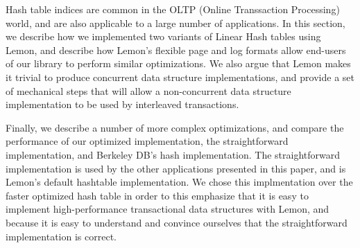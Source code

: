 \documentclass[letterpaper,twocolumn,english]{article}
\newcommand{\yad}{Lemon\xspace}
\begin{document}

%

Hash table indices are common in the OLTP (Online Transsaction
Processing) world, and are also applicable to a large number of
applications.  In this section, we describe how we implemented two
variants of Linear Hash tables using \yad, and describe how \yad's
flexible page and log formats allow end-users of our library to
perform similar optimizations.  We also argue that \yad makes it
trivial to produce concurrent data structure implementations, and
provide a set of mechanical steps that will allow a non-concurrent
data structure implementation to be used by interleaved transactions.

Finally, we describe a number of more complex optimizations, and
compare the performance of our optimized implementation, the
straightforward implementation, and Berkeley DB's hash implementation.
The straightforward implementation is used by the other applications
presented in this paper, and is \yad's default hashtable
implementation.  We chose this implmentation over the faster optimized
hash table in order to this emphasize that it is easy to implement
high-performance transactional data structures with \yad, and because
it is easy to understand and convince ourselves that the
straightforward implementation is correct.
\end{document}
